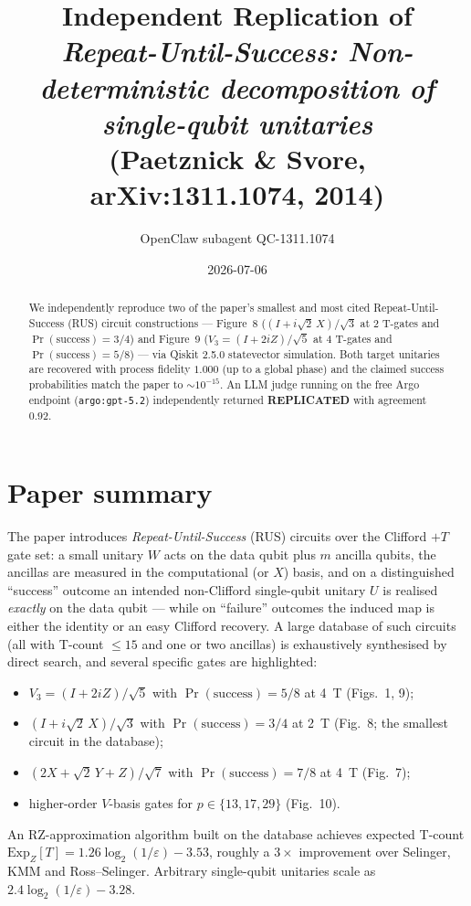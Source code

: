 \documentclass[11pt,a4paper]{article}
\title{Independent Replication of\\
\emph{Repeat-Until-Success: Non-deterministic decomposition of single-qubit unitaries}\\
{\normalsize (Paetznick \& Svore, arXiv:1311.1074, 2014)}}
\author{OpenClaw subagent QC-1311.1074}
\date{2026-07-06}
\newcommand{\Vthree}{V_{\!3}}
\newcommand{\Prsucc}{\Pr(\text{success})}
\begin{document}
\maketitle

\begin{abstract}
We independently reproduce two of the paper's smallest and most cited
Repeat-Until-Success (RUS) circuit constructions --- Figure~8
($(I + i\sqrt{2}\,X)/\sqrt{3}$ at 2 T-gates and $\Prsucc = 3/4$) and
Figure~9 ($\Vthree = (I + 2iZ)/\sqrt{5}$ at 4 T-gates and $\Prsucc = 5/8$) ---
via Qiskit 2.5.0 statevector simulation. Both target unitaries are recovered
with process fidelity $1.000$ (up to a global phase) and the claimed success
probabilities match the paper to $\sim\!10^{-15}$. An LLM judge running on
the free Argo endpoint (\texttt{argo:gpt-5.2}) independently returned
\textbf{REPLICATED} with agreement $0.92$.
\end{abstract}

\section{Paper summary}

The paper introduces \emph{Repeat-Until-Success} (RUS) circuits over the
Clifford $+ T$ gate set: a small unitary $W$ acts on the data qubit plus
$m$ ancilla qubits, the ancillas are measured in the computational (or $X$)
basis, and on a distinguished ``success'' outcome an intended non-Clifford
single-qubit unitary $U$ is realised \emph{exactly} on the data qubit --- while
on ``failure'' outcomes the induced map is either the identity or an easy
Clifford recovery.  A large database of such circuits (all with T-count
$\le 15$ and one or two ancillas) is exhaustively synthesised by direct search,
and several specific gates are highlighted:

\begin{itemize}
  \item $\Vthree = (I + 2iZ)/\sqrt{5}$ with $\Prsucc = 5/8$ at 4~T (Figs.~1, 9);
  \item $(I + i\sqrt{2}\,X)/\sqrt{3}$ with $\Prsucc = 3/4$ at 2~T (Fig.~8;
        the smallest circuit in the database);
  \item $(2X + \sqrt{2}\,Y + Z)/\sqrt{7}$ with $\Prsucc = 7/8$ at 4~T (Fig.~7);
  \item higher-order $V$-basis gates for $p \in \{13,17,29\}$ (Fig.~10).
\end{itemize}

An RZ-approximation algorithm built on the database achieves expected T-count
$\mathrm{Exp}_Z[T] = 1.26 \log_2(1/\varepsilon) - 3.53$, roughly a $3\times$
improvement over Selinger, KMM and Ross--Selinger. Arbitrary single-qubit
unitaries scale as $2.4 \log_2(1/\varepsilon) - 3.28$.
\end{document}
